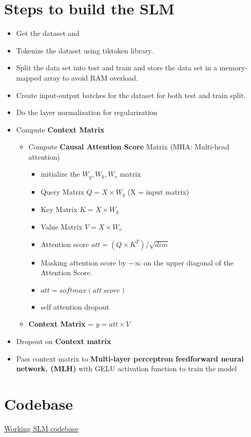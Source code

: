 \documentclass[conference]{IEEEtran}
\begin{document}
\section{Steps to build the SLM}
\begin{itemize}
    \item Get the dataset and 
    \item Tokenize the dataset using tiktoken library.
    \item Split the data set into test and train and store the data set in a memory-mapped array to avoid RAM overload.
    \item Create input-output batches for the dataset for both test and train split.
    \item Do the layer normalization for regularization
    \item Compute \textbf{Context Matrix} 
    \begin{itemize}
        \item Compute \textbf{Causal Attention Score} Matrix (MHA: Multi-head attention)
        \begin{itemize}
            \item initialize the $W_q, W_k, W_v$ matrix
            \item Query Matrix $Q = X \times W_q$ (X = input matrix)
            \item Key Matrix $K =  X \times W_k$ 
            \item Value Matrix $V = X \times W_v$
            \item Attention score $att = (Q \times K^T)/ \sqrt{dim}$
            \item Masking attention score by $-\infty$ on the upper diagonal of the Attention Score.
            \item $att = softmax(att \ score)$
            \item self attention dropout
        \end{itemize}
        \item \textbf{Context Matrix} = $y = att \times V$
    \end{itemize}
    \item Dropout on \textbf{Context matrix} 
    \item Pass context matrix to \textbf{Multi-layer perceptron feedforward neural network. (MLH)} with GELU activation function to train the model
\end{itemize}

\section{Codebase}
\href{https://colab.research.google.com/github/samratkar/samratkar.github.io/blob/main/_posts/concepts/genai/notes-codes/slm-from-scratch/slm-jc.ipynb}{Working SLM codebase}
\end{document}
